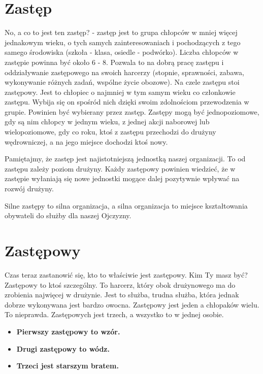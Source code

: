  
\section{Zastęp}
No, a co to jest ten zastęp? - zastęp jest to grupa chłopców w mniej więcej jednakowym wieku, o tych samych zainteresowaniach i pochodzących z  tego samego środowiska (szkoła - klasa, osiedle - podwórko). 
Liczba  chłopców  w  zastępie  powinna  być około 6 - 8. Pozwala to na dobrą pracę zastępu i oddziaływanie zastępowego  na swoich harcerzy (stopnie, sprawności, zabawa, wykonywanie różnych zadań, wspólne życie obozowe). 
Na czele zastępu stoi zastępowy. 
Jest to chłopiec  o najmniej w tym samym  wieku co członkowie zastępu. Wybija się on spośród nich dzięki swoim zdolnościom przewodzenia w grupie. 
Powinien być wybierany przez zastęp. 
Zastępy mogą być jednopoziomowe, gdy są nim chłopcy w jednym wieku, z jednej akcji naborowej lub wielopoziomowe, gdy co roku, ktoś z zastępu przechodzi do drużyny wędrowniczej, a na jego miejsce dochodzi ktoś nowy.

Pamiętajmy,  że zastęp jest najistotniejszą jednostką naszej organizacji. 
To od zastępu zależy poziom drużyny. 
Każdy zastępowy powinien wiedzieć, że w zastępie wyłaniają się nowe jednostki mogące dalej pozytywnie wpływać  na  rozwój  drużyny.

Silne zastępy to silna organizacja, a silna organizacja to miejsce kształtowania obywateli do  służby dla naszej Ojczyzny.
	
\section{Zastępowy}
 Czas teraz zastanowić się, kto to właściwie jest zastępowy. Kim Ty masz być? Zastępowy to ktoś szczególny. To harcerz, który obok drużynowego ma do zrobienia najwięcej w drużynie. Jest to służba, trudna służba, która jednak dobrze wykonywana jest bardzo owocna. 
	Zastępowy jest jeden a chłopaków wielu. To nieprawda. Zastępowych jest trzech, a wszystko to w jednej osobie.
\begin{itemize}
\item \textbf{Pierwszy zastępowy  to  wzór.}
\item \textbf{Drugi zastępowy to wódz.}
\item \textbf{Trzeci jest  starszym bratem.}
\end{itemize}


